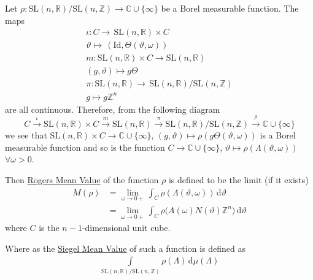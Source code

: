 \documentclass[11pt]{article}
\theoremstyle{definition}
\theoremstyle{proof}
\begin{document}
Let $\rho : \mathrm{SL}(n,\mathbb{R})/\mathrm{SL}(n,\mathbb{Z}) \to \mathbb{C} \cup \{\infty\}$ be a Borel measurable function.
The maps
\begin{gather*}
    \iota : C \to \, \mathrm{SL}(n,\mathbb{R}) \times C \\
    \vartheta \mapsto \, (\mathrm{Id}, \Theta (\vartheta, \omega )) \\
    m : \mathrm{SL}(n,\mathbb{R}) \times C \to  \mathrm{SL}(n,\mathbb{R}) \\
    (g, \vartheta ) \mapsto g \Theta \\
    \pi : \mathrm{SL}(n,\mathbb{R}) \to \, \mathrm{SL}(n,\mathbb{R})/\mathrm{SL}(n,\mathbb{Z}) \\
    g \mapsto g\mathbb{Z}^{n}
\end{gather*}
are all continuous.
Therefore, from the following diagram
\[
    C \xrightarrow{\iota } \mathrm{SL}(n,\mathbb{R}) \times C \xrightarrow{m} \mathrm{SL}(n,\mathbb{R}) \xrightarrow{ \pi } \mathrm{SL}(n,\mathbb{R})/\mathrm{SL}(n,\mathbb{Z}) \xrightarrow{\rho } \mathbb{C} \cup \{\infty\}
\]
we see that $\mathrm{SL}(n,\mathbb{R}) \times C \to \mathbb{C} \cup \{\infty\}$, $(g,\vartheta ) \mapsto \rho (g \Theta (\vartheta , \omega ))$ is a Borel measurable function and so is the function $C \to \mathbb{C} \cup \{\infty\}$, $\vartheta \mapsto \rho (\Lambda (\vartheta , \omega ))$ $\forall \omega > 0$.

Then \uline{Rogers Mean Value} of the function $\rho$ is defined to be the limit (if it exists)
\begin{equation}\label{rmv}
    \begin{split}
        M(\rho ) &= \lim_{\omega \to 0+} \int_{C} \rho (\Lambda (\vartheta , \omega )) \, \mathrm{d} \vartheta \\
        &= \lim_{\omega \to 0+} \int_{C} \rho \big(A(\omega ) N(\vartheta ) \mathbb{Z}^{n}\big) \, \mathrm{d} \vartheta 
    \end{split}
\end{equation}
where $C$ is the $n-1$-dimensional unit cube.

Where as the \uline{Siegel Mean Value} of such a function is defined as
\begin{equation}\label{smv}
    \begin{split}
        \int\limits_{\mathrm{SL}(n,\mathbb{R})/\mathrm{SL}(n,\mathbb{Z})} \rho (\Lambda ) \, \mathrm{d} \mu (\Lambda )
    \end{split}
\end{equation}
\end{document}
